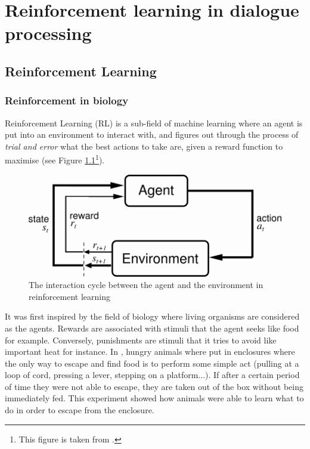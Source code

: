 \chapter{Reinforcement learning in dialogue processing}
\label{ch:soarl}

\section{Reinforcement Learning}
\label{soa:rl}

	\subsection{Reinforcement in biology}
    
		Reinforcement Learning (RL) is a sub-field of machine learning where an agent is put into an environment to interact with, and figures out through the process of \textit{trial and error} what the best actions to take are, given a reward function to maximise \cite{Sutton1998} (see Figure \ref{fig:rlscheme}\footnote{This figure is taken from \cite{Sutton1998}.}).
			
			\begin{figure}[ht]
				\centering
				\includegraphics[scale=0.7]{figures/rl.png}
				\caption{The interaction cycle between the agent and the environment in reinforcement learning}
				\label{fig:rlscheme}
			\end{figure}
			
			It was first inspired by the field of biology where living organisms are considered as the agents. Rewards are associated with stimuli that the agent seeks like food for example. Conversely, punishments are stimuli that it tries to avoid like important heat for instance. In \cite{Thorndike1898}, hungry animals where put in enclosures where the only way to escape and find food is to perform some simple act (pulling at a loop of cord, pressing a lever, stepping on a platform...). If after a certain period of time they were not able to escape, they are taken out of the box without being immediately fed. This experiment showed how animals were able to learn what to do in order to escape from the enclosure.
			
